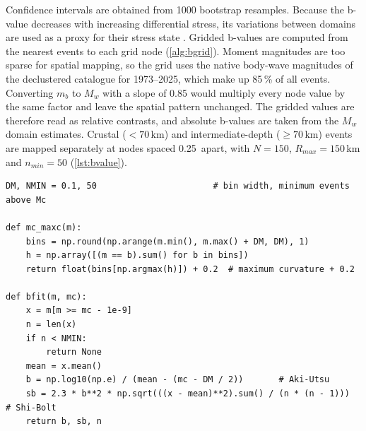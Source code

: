 \documentclass[11pt]{article}
\begin{document}
Confidence intervals are obtained from 1000 bootstrap resamples. Because the b-value
decreases with increasing differential stress, its variations between domains are
used as a proxy for their stress state \cite{Scholz1968, Schorlemmer2005,
Scholz2015}. Gridded b-values are computed from the nearest events to each grid node
(\cref{alg:bgrid}). Moment magnitudes are too sparse for spatial mapping, so the grid
uses the native body-wave magnitudes of the declustered catalogue for 1973--2025,
which make up 85\,\% of all events. Converting $m_b$ to $M_w$ with a slope of 0.85
would multiply every node value by the same factor and leave the spatial pattern
unchanged. The gridded values are therefore read as relative contrasts, and absolute
b-values are taken from the $M_w$ domain estimates. Crustal ($<70$\,km) and
intermediate-depth ($\geq 70$\,km) events are mapped separately at nodes spaced
0.25\textdegree\ apart, with $N = 150$, $R_{max} = 150$\,km and $n_{min} = 50$
(\cref{lst:bvalue}).

\begin{lstlisting}[caption={Completeness by maximum curvature, Aki--Utsu b-value and
Shi--Bolt standard error, applied per domain and per grid node (Python 3, NumPy).},
label={lst:bvalue}]
DM, NMIN = 0.1, 50                       # bin width, minimum events above Mc

def mc_maxc(m):
    bins = np.round(np.arange(m.min(), m.max() + DM, DM), 1)
    h = np.array([(m == b).sum() for b in bins])
    return float(bins[np.argmax(h)]) + 0.2  # maximum curvature + 0.2

def bfit(m, mc):
    x = m[m >= mc - 1e-9]
    n = len(x)
    if n < NMIN:
        return None
    mean = x.mean()
    b = np.log10(np.e) / (mean - (mc - DM / 2))       # Aki-Utsu
    sb = 2.3 * b**2 * np.sqrt(((x - mean)**2).sum() / (n * (n - 1)))  # Shi-Bolt
    return b, sb, n
\end{lstlisting}

\begin{algorithm}[htbp]
\caption{Gridded b-value mapping with nearest-$N$ sampling.}\label{alg:bgrid}
\begin{algorithmic}[1]
\end{algorithmic}
\end{algorithm}
\end{document}
